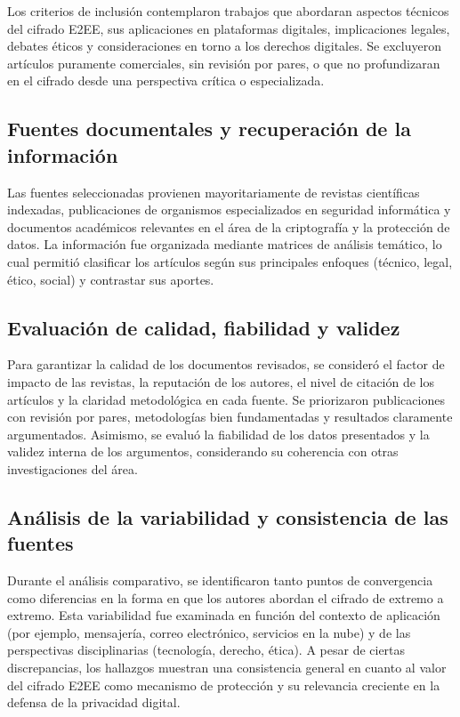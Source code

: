 \documentclass[spanish,12pt,a4paper]{article}
\begin{document}
\begin{multicols}{2}
		Los criterios de inclusión contemplaron trabajos que abordaran aspectos técnicos del cifrado E2EE, sus aplicaciones en plataformas digitales, implicaciones legales, debates éticos y consideraciones en torno a los derechos digitales. Se excluyeron artículos puramente comerciales, sin revisión por pares, o que no profundizaran en el cifrado desde una perspectiva crítica o especializada.
		
		\subsection*{\normalsize Fuentes documentales y recuperación de la información }
		Las fuentes seleccionadas provienen mayoritariamente de revistas científicas indexadas, publicaciones de organismos especializados en seguridad informática y documentos académicos relevantes en el área de la criptografía y la protección de datos. La información fue organizada mediante matrices de análisis temático, lo cual permitió clasificar los artículos según sus principales enfoques (técnico, legal, ético, social) y contrastar sus aportes.
		
		\subsection*{\normalsize Evaluación de calidad, fiabilidad y validez }
		Para garantizar la calidad de los documentos revisados, se consideró el factor de impacto de las revistas, la reputación de los autores, el nivel de citación de los artículos y la claridad metodológica en cada fuente. Se priorizaron publicaciones con revisión por pares, metodologías bien fundamentadas y resultados claramente argumentados. Asimismo, se evaluó la fiabilidad de los datos presentados y la validez interna de los argumentos, considerando su coherencia con otras investigaciones del área.
		
		\subsection*{\normalsize Análisis de la variabilidad y consistencia de las fuentes }
		
		Durante el análisis comparativo, se identificaron tanto puntos de convergencia como diferencias en la forma en que los autores abordan el cifrado de extremo a extremo. Esta variabilidad fue examinada en función del contexto de aplicación (por ejemplo, mensajería, correo electrónico, servicios en la nube) y de las perspectivas disciplinarias (tecnología, derecho, ética). A pesar de ciertas discrepancias, los hallazgos muestran una consistencia general en cuanto al valor del cifrado E2EE como mecanismo de protección y su relevancia creciente en la defensa de la privacidad digital.
		
	\end{multicols}
	
	
	
	\printbibliography
	
\end{document}
